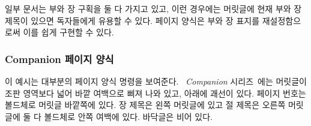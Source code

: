 일부 문서는 부와 장 구획을 둘 다 가지고 있고, 이런 경우에는 머릿글에 현재 부와
장 제목이 있으면 독자들에게 유용할 수 있다.
 페이지 양식은 부와 장 표지를 재설정함으로써 이를 쉽게 구현할
수 있다.
\begin{lcode}
\end{lcode}
  

\subsubsection{Companion 페이지 양식}

이 예시는 대부분의 페이지 양식 명령을 보여준다.
\textit{\ltx\ Companion} 시리즈~\cite{COMPANION,GCOMPANION,WCOMPANION}에는
머릿글이 조판 영역보다 넓어 바깥
여백으로 삐져 나와 있고, 아래에 괘선이 있다.
페이지 번호는 볼드체로 머릿글 바깥쪽에 있다.
장 제목은 왼쪽 머릿글에 있고 절 제목은 오른쪽
머릿글에 둘 다 볼드체로 안쪽
여백에 있다.
바닥글은 비어 있다.

